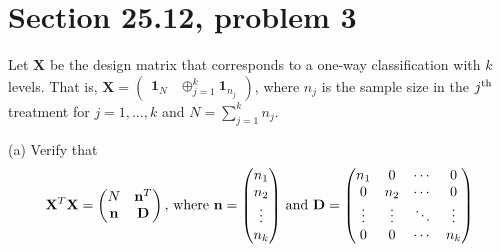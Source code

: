 \section{Section 25.12, problem 3}
Let $\mathbf X$ be the design matrix that corresponds to a
one-way classification with $k$ levels.
That is, $\mathbf X=\begin{pmatrix}\mathbf 1_N
&\oplus_{j=1}^k\mathbf 1_{n_j}\end{pmatrix}$, where $n_j$ is the sample size
in the $j^{\rm th}$ treatment for $j=1,\ldots,k$
and $N=\sum_{j=1}^kn_j$.

\bigskip
\noindent
(a) Verify that
$$\mathbf X^T\mathbf X=
\begin{pmatrix}
N & \mathbf n^T\cr
\mathbf n & \mathbf D
\end{pmatrix},\,
\hbox{where
$\mathbf n=\begin{pmatrix}
n_1\cr
n_2\cr
\vdots\cr
n_k
\end{pmatrix}
$ and
$\mathbf D=\begin{pmatrix}
n_1 & 0 & \cdots & 0\cr
0 & n_2 & \cdots & 0\cr
\vdots & \vdots & \ddots & \vdots\cr
0 & 0 & \cdots & n_k
\end{pmatrix}
$}
$$

